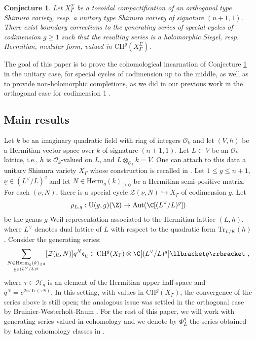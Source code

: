 \documentclass[11pt,letterpaper,english]{amsart}
\numberwithin{equation}{subsection}
\numberwithin{equation}{section}
\newcommand\cH{{\mathcal H}}
\newcommand\cZ{{\mathcal Z}}
\newcommand{\trace}{\mathrm{Tr}}
\theoremstyle{plain}
\newtheorem{conjecture}[theorem]{Conjecture}
\theoremstyle{remark}
\begin{document}
\begin{conjecture}\label{main-conjecture}
Let $X_\Gamma^\Sigma$ be a toroidal compactification of an orthogonal type Shimura variety, resp. a unitary type Shimura variety of signature $(n+1,1)$. There exist boundary corrections to the generating series of special cycles of codimension $g\geq 1$ such that the resulting series is a holomorphic Siegel, resp. Hermitian,  modular form, valued in $\mathrm{CH}^g(X_\Gamma^\Sigma)$.
\end{conjecture}

The goal of this paper is to prove the cohomological incarnation of Conjecture \ref{main-conjecture} in the unitary case, for special cycles of codimension up to the middle, as well as to provide non-holomorphic completions, as we did in our previous work in the orthogonal case for codimension 1 \cite{engel-greer-tayou}. 

\subsection{Main results}

Let $k$ be an imaginary quadratic field with ring of integers $\mathcal{O}_k$ and let $(V,h)$ be a Hermitian vector space over $k$ of signature $(n+1,1)$. Let $L\subset V$ be an $\mathcal{O}_k$-lattice, i.e., $h$ is $\mathcal{O}_k$-valued on $L$, and $L\otimes_{\mathcal{O}_k}k=V$.  One can attach to this data a unitary Shimura variety $X_\Gamma$ whose construction is recalled in . Let $1\leq g\leq n+1$, $\underline\nu\in (L^\vee/L)^{g}$  and let $N\in\mathrm{Herm}_{g}(k)_{\geq 0}$ be a Hermitian semi-positive matrix. For each $(\underline{\nu},N)$, there is a special cycle $\cZ(\underline{\nu},N)\hookrightarrow X_\Gamma$ of codimension $g$. Let
\[\rho_{L,g}: \mathrm{U}(g,g)(\Z) \rightarrow \mathrm{Aut}(\C[(L^\vee/L)^g]) \]
be the genus $g$ Weil representation associated to the Hermitian lattice $(L,h)$, where $L^\vee$ denotes dual lattice of $L$ with respect to the quadratic form $\trace_{L/K}(h)$. Consider the generating series:
\begin{align}\label{gen-series-chow}
\sum_{\underset{\underline{\nu}\in (L^\vee/L)^g}{N\in \mathrm{Herm}_{g}(k)_{\geq 0}}} [\cZ(\underline{\nu},N)]q^N \mathfrak{e}_{\underline\nu}\in \mathrm{CH}^g(X_\Gamma)\otimes \C[(L^\vee/L)^g] \llbracket q \rrbracket~,
\end{align}
where $\tau\in \cH_g$ is an element of the Hermitian upper half-space and $q^N=e^{2i\pi \trace(\tau N  )}$. In this setting, with values in $\mathrm{CH}^g(X_\Gamma)$, the convergence of the series above is still open; the analogous issue was settled in the orthogonal case by Bruinier-Westerholt-Raum \cite{Bruinier-Westerholt-Raum}. For the rest of this paper, we will work with generating series valued in cohomology and we denote by $\Phi_L^g$ the series obtained by taking cohomology classes in .
\medskip
\end{document}
